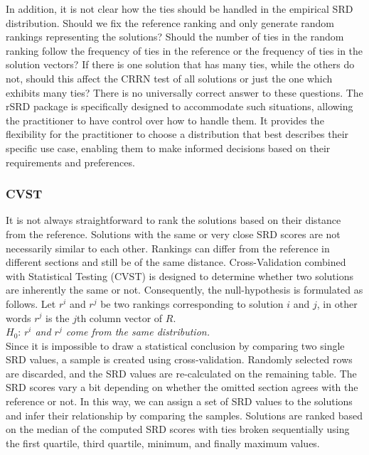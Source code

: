 In addition, it is not clear how the ties should be handled in the empirical SRD distribution. Should we fix the reference ranking and only generate random rankings representing the solutions? Should the number of ties in the random ranking follow the frequency of ties in the reference or the frequency of ties in the solution vectors? If there is one solution that has many ties, while the others do not, should this affect the CRRN test of all solutions or just the one which exhibits many ties? There is no universally correct answer to these questions. The rSRD package is specifically designed to accommodate such situations, allowing the practitioner to have control over how to handle them. It provides the flexibility for the practitioner to choose a distribution that best describes their specific use case, enabling them to make informed decisions based on their requirements and preferences.

\subsubsection{CVST}

It is not always straightforward to rank the solutions based on their distance from the reference. Solutions with the same or very close SRD scores are not necessarily similar to each other. Rankings can differ from the reference in different sections and still be of the same distance. Cross-Validation combined with Statistical Testing (CVST) is designed to determine whether two solutions are inherently the same or not. Consequently, the null-hypothesis is formulated as follows. Let $r^i$ and $r^j$ be two rankings corresponding to solution $i$ and $j$, in other words $r^j$ is the $j$th column vector of $R$.\\

$H_0$: \emph{$r^i$ and $r^j$ come from the same distribution.}\\

Since it is impossible to draw a statistical conclusion by comparing two single SRD values, a sample is created using cross-validation. Randomly selected rows are discarded, and the SRD values are re-calculated on the remaining table. The SRD scores vary a bit depending on whether the omitted section agrees with the reference or not. In this way, we can assign a set of SRD values to the solutions and infer their relationship by comparing the samples. Solutions are ranked based on the median of the computed SRD scores with ties broken sequentially using the first quartile, third quartile, minimum, and finally maximum values.


